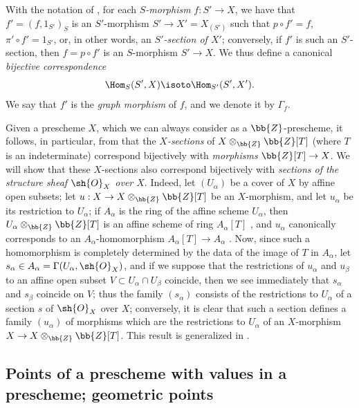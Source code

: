 \begin{env}[3.3.14]
\label{I.3.3.14}
With the notation of , for each \emph{$S$-morphism}
$f:S'\to X$, we have that $f'=(f,1_{S'})_S$ is an $S'$-morphism $S'\to X'=X_{(S')}$ such that
$p\circ f'=f$, $\pi'\circ f'=1_{S'}$, or, in other words, an
\emph{$S'$-section of $X'$}; conversely, if $f'$ is such an $S'$-section, then
$f=p\circ f'$ is an
$S$-morphism $S'\to X$. We thus define a canonical
\emph{bijective correspondence}
\[
  \Hom_S(S',X)\isoto\Hom_{S'}(S',X').
\]
We say that $f'$ is the \emph{graph morphism} of $f$, and we denote it by
$\Gamma_f$.
\end{env}

\begin{env}[3.3.15]
\label{I.3.3.15}
Given a prescheme $X$, which we can always consider as a $\bb{Z}$-prescheme,
it follows, in particular, from  that the \emph{$X$-sections} of
$X\otimes_\bb{Z}\bb{Z}[T]$ (where $T$ is an indeterminate)
correspond bijectively with \emph{morphisms} $\bb{Z}[T]\to X$. We will show that these
$X$-sections also correspond bijectively with \emph{sections of the structure
sheaf $\sh{O}_X$ over $X$}. Indeed, let $(U_\alpha)$ be a cover of $X$ by
affine open subsets; let $u:X\to X\otimes_\bb{Z}\bb{Z}[T]$ be an $X$-morphism, and let
$u_\alpha$ be its restriction to $U_\alpha$; if $A_\alpha$ is the ring of the
affine scheme $U_\alpha$, then $U_\alpha\otimes_\bb{Z}\bb{Z}[T]$ is an affine
scheme of ring $A_\alpha[T]$ , and $u_\alpha$ canonically
corresponds to an $A_\alpha$-homomorphism $A_\alpha[T]\to A_\alpha$
. Now, since such a homomorphism is completely determined by the
data of the image of $T$ in $A_\alpha$, let
$s_\alpha\in A_\alpha=\Gamma(U_\alpha,\sh{O}_X)$, and if we suppose that the
restrictions of $u_\alpha$ and $u_\beta$ to an affine open subset
$V\subset U_\alpha\cap U_\beta$ coincide, then we see immediately that
$s_\alpha$ and $s_\beta$ coincide on $V$; thus the family $(s_\alpha)$ consists
of the restrictions to $U_\alpha$ of a section $s$ of $\sh{O}_X$ over $X$;
conversely, it is clear that such a section defines a family $(u_\alpha)$ of
morphisms which are the restrictions to $U_\alpha$ of an $X$-morphism
$X\to X\otimes_\bb{Z}\bb{Z}[T]$. This result is generalized in
.
\end{env}

\subsection{Points of a prescheme with values in a prescheme; geometric points}
\label{subsection:I.3.4}

